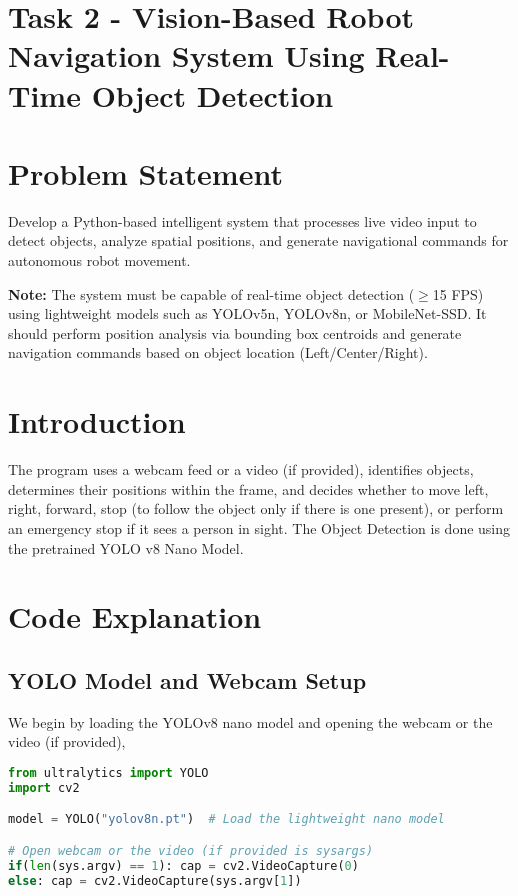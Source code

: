 \documentclass[12pt]{article}
\title{}
\author{EE24BTECH11002 Agamjot Singh\\IIT Hyderabad}
\date{\today}
\begin{document}
\maketitle
\section*{Task 2 - Vision-Based Robot Navigation System Using Real-Time Object Detection}

\section*{Problem Statement}

Develop a Python-based intelligent system that processes live video input to detect objects, analyze spatial positions, and generate navigational commands for autonomous robot movement.

\textbf{Note:} The system must be capable of real-time object detection ($\geq$15 FPS) using lightweight models such as YOLOv5n, YOLOv8n, or MobileNet-SSD. It should perform position analysis via bounding box centroids and generate navigation commands based on object location (Left/Center/Right).

\section*{Introduction}
The program uses a webcam feed or a video (if provided), identifies objects, determines their positions within the frame, and decides whether to move left, right, forward, stop (to follow the object only if there is one present), or perform an emergency stop if it sees a person in sight.
\newline
The Object Detection is done using the pretrained YOLO v8 Nano Model.


\section*{Code Explanation}

\subsection*{YOLO Model and Webcam Setup}
We begin by loading the YOLOv8 nano model and opening the webcam or the video (if provided),

\begin{lstlisting}[language=Python]
from ultralytics import YOLO
import cv2

model = YOLO("yolov8n.pt")  # Load the lightweight nano model

# Open webcam or the video (if provided is sysargs)
if(len(sys.argv) == 1): cap = cv2.VideoCapture(0)
else: cap = cv2.VideoCapture(sys.argv[1])
\end{lstlisting}
\end{document}
